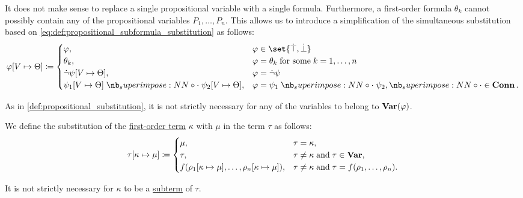 \begin{definition}
\begin{thmenum}
    It does not make sense to replace a single propositional variable with a single formula. Furthermore, a first-order formula \( \theta_k \) cannot possibly contain any of the propositional variables \( P_1, \ldots, P_n \). This allows us to introduce a simplification of the simultaneous substitution based on \eqref{eq:def:propositional_subformula_substitution} as follows:
    \begin{equation}\label{eq:def:first_order_substitution/propositional}
      \varphi[V \mapsto \Theta] \coloneqq \begin{cases}
        \varphi,                                                    &\varphi \in \set{ \syntop, \synbot } \\
        \theta_k,                                                   &\varphi = \theta_k \T{for some} k = 1, \ldots, n \\
        \synneg \psi[V \mapsto \Theta],                                &\varphi = \synneg \psi \\
        \psi_1[V \mapsto \Theta] \syncirc \psi_2[V \mapsto \Theta], &\varphi = \psi_1 \syncirc \psi_2, {\syncirc} \in \op*{Conn}.
      \end{cases}
    \end{equation}

    As in \cref{def:propositional_substitution}, it is not strictly necessary for any of the variables to belong to \( \op*{Var}(\varphi) \).

     We define the substitution of the \hyperref[def:first_order_syntax/term]{first-order term} \( \kappa \) with \( \mu \) in the term \( \tau \) as follows:
    \begin{equation}\label{eq:def:first_order_substitution/term_in_term}
      \tau[\kappa \mapsto \mu] \coloneqq \begin{cases}
        \mu,                                                               &\tau = \kappa, \\
        \tau,                                                              &\tau \neq \kappa \T{and} \tau \in \op*{Var}, \\
        f(\rho_1[\kappa \mapsto \mu], \ldots, \rho_n[\kappa \mapsto \mu]), &\tau \neq \kappa \T{and} \tau = f(\rho_1, \ldots, \rho_n).
      \end{cases}
    \end{equation}

    It is not strictly necessary for \( \kappa \) to be a \hyperref[def:first_order_syntax/subterm]{subterm} of \( \tau \).


\end{thmenum}
\end{definition}
